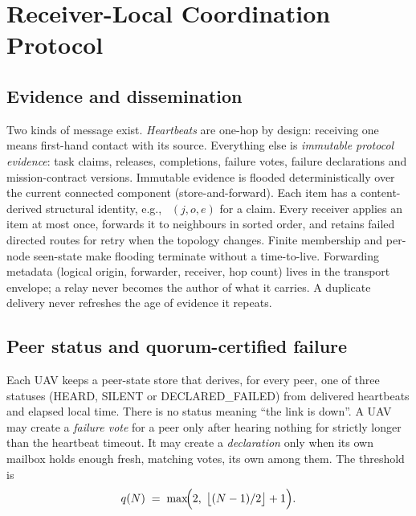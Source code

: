 \documentclass[conference]{IEEEtran}
\newcommand{\stt}[1]{\textsf{#1}}     %
\newcommand{\eg}{e.g.,\ }
\begin{document}
\section{Receiver-Local Coordination Protocol}
\label{sec:protocol}

\subsection{Evidence and dissemination}
\label{sec:evidence}

Two kinds of message exist. \emph{Heartbeats} are one-hop by design: receiving
one means first-hand contact with its source. Everything else is
\emph{immutable protocol evidence}: task claims, releases, completions,
failure votes, failure declarations and mission-contract versions. Immutable
evidence is flooded deterministically over the current connected component
(store-and-forward). Each item has a content-derived structural identity, \eg
$(j,o,e)$ for a claim. Every receiver applies an item at most once, forwards
it to neighbours in sorted order, and retains failed directed routes for retry
when the topology changes. Finite membership and per-node seen-state make
flooding terminate without a time-to-live. Forwarding metadata (logical
origin, forwarder, receiver, hop count) lives in the transport envelope; a
relay never becomes the author of what it carries. A duplicate delivery never
refreshes the age of evidence it repeats.

\subsection{Peer status and quorum-certified failure}
\label{sec:failure}

Each UAV keeps a peer-state store that derives, for every peer, one of three
statuses (\stt{HEARD}, \stt{SILENT} or \stt{DECLARED\_FAILED}) from
delivered heartbeats and elapsed local time. There is no status meaning ``the link is
down''. A UAV may create a \emph{failure vote} for a peer only after hearing
nothing for strictly longer than the heartbeat timeout. It may create a
\emph{declaration} only when its own mailbox holds enough fresh, matching
votes, its own among them. The threshold is
\begin{equation}
  q(N) \;=\; \max\!\Bigl(2,\; \bigl\lfloor (N-1)/2 \bigr\rfloor + 1\Bigr).
  \label{eq:quorum}
\end{equation}
\end{document}
